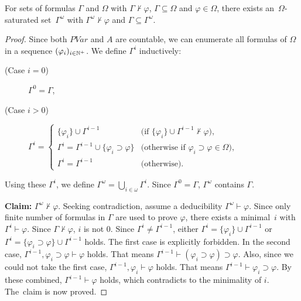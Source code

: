 \begin{lemma}
\label{lemma:saturation}
 For sets of formulas $\Gamma$ and $\Omega$ with $\Gamma\not\vdash\varphi$, 
 $\Gamma\subseteq \Omega$ and $\varphi \in \Omega$,
there exists an~$\Omega$-saturated
 set~$\Gamma^\omega$ with $\Gamma^\omega\not\vdash\varphi$
 and $\Gamma\subseteq \Gamma^\omega$.
\end{lemma}
\begin{proof}
 Since both $PVar$ and $A$ are countable, we can enumerate all formulas
 of $\Omega$ in a sequence
 $(\varphi_i)_{i\in{\mathbb N}^{+}}$.
 We define $\Gamma^i$ inductively:
\begin{description}
 \item[(Case $i = 0$)] $\Gamma^0 = \Gamma$,
 \item[(Case $i > 0$)] $\Gamma^i =
\begin{cases}
\{\varphi_{i}\}\cup \Gamma^{i-1} & \text{(if
 $\{\varphi_{i}\}\cup\Gamma^{i-1}\not\vdash\varphi$)}, \\
\Gamma^i = \Gamma^{i-1} \cup\{\varphi_{i}\supset\varphi\} &\text{(otherwise if
 $\varphi_i\supset \varphi\in \Omega)$},\\
 \Gamma^i = \Gamma^{i-1} &\text{(otherwise)}.
\end{cases}$
\end{description}
Using these $\Gamma^i$\kern -1pt, we define $\Gamma^\omega = \bigcup_{i\in\omega}
 \Gamma^i$\kern -1pt.
\noindent Since $\Gamma^0 = \Gamma$\kern -2pt, $\Gamma^\omega$ contains
 $\Gamma$\kern -2pt.

\noindent
\textbf{Claim:} 
 $\Gamma^\omega \not\vdash \varphi$.
Seeking contradiction, assume a deducibility $\Gamma^\omega\vdash\varphi$. 
Since only finite number of formulas in $\Gamma$ are used to prove $\varphi$,
there exists 
 a minimal~$i$ with
 $\Gamma^i\vdash\varphi$. Since $\Gamma\not\vdash\varphi$, $i$ is not 0.
 Since $\Gamma^i\neq \Gamma^{i-1}$, 
 either $\Gamma^i = \{\varphi_{i}\} \cup \Gamma^{i-1}$ 
or $\Gamma^i = \{\varphi_{i}\supset\varphi\}\cup \Gamma^{i-1}$ holds.
 The first case is explicitly forbidden.
 In the second case, $\Gamma^{i-1},\varphi_{i}\supset\varphi\vdash \varphi$ holds.
 That means $\Gamma^{i-1}\vdash (\varphi_{i}\supset\varphi)\supset \varphi$.
 Also, since we could not take the first case, $\Gamma^{i-1},\varphi_{i}\vdash \varphi$
 holds. That means $\Gamma^{i-1}\vdash \varphi_{i}\supset\varphi$.
 By these combined, $\Gamma^{i-1}\vdash\varphi$ holds, which contradicts to the minimality of
 $i$. The~claim is now proved.
\end{proof}

